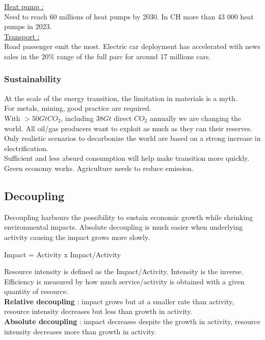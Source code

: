 \documentclass[../main.tex]{subfiles}
\begin{document}
\quad \underline{Heat pump :}\\
Need to reach 60 millions of heat pumps by 2030. In CH more than 43 000 heat pumps in 2023.\\

\quad \underline{Transport :}\\
Road passenger emit the most. Electric car deployment has accelerated with news sales in the $20\%$ range of the full parc for around 17 millions cars. \\

\subsubsection{Sustainability}
At the scale of the energy transition, the limitation in materials is a myth. \\
For metals, mining, good practice are required. \\
With $>50Gt CO_2$, including $38Gt$ direct $CO_2$ annually we are changing the world. All oil/gas producers want to exploit as much as they can their reserves. Only realistic scenarios to decarbonize the world are based on a strong increase in electrification.\\
Sufficient and less absurd consumption will help make transition more quickly. Green economy works. Agriculture needs to reduce emission. 


\subsection{Decoupling}
Decoupling harbours the possibility to sustain economic growth while shrinking environmental impacts. Absolute decoupling is much easier when underlying activity causing the impact grows more slowly.\\

\begin{center}
    Impact = Activity x Impact/Activity
\end{center}
Resource intensity is defined as the Impact/Activity. Intensity is the inverse. \\
Efficiency is measured by how much service/activity is obtained with a given quantity of resource. \\
\textbf{Relative decoupling} : impact grows but at a smaller rate than activity, resource intensity decreases but less than growth in activity.\\
\textbf{Absolute decoupling} : impact decreases despite the growth in activity, resource intensity decreases more than growth in activity.\\
\end{document}
